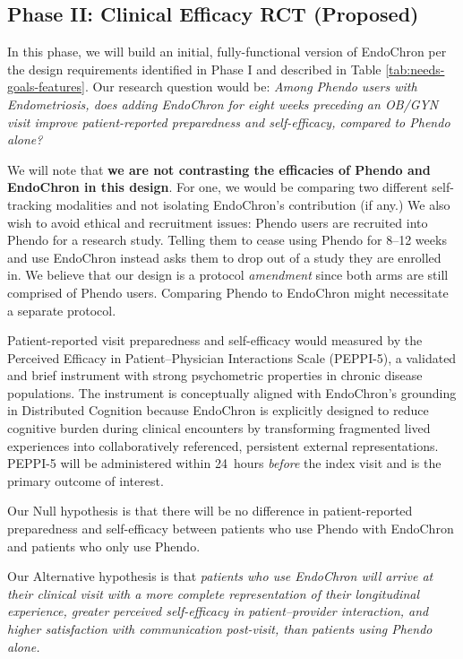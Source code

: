 \subsection{Phase II: Clinical Efficacy RCT (Proposed)}
\label{sec:efficacy-rct}

In this phase, we will build an initial, fully-functional version of EndoChron per the design requirements identified in Phase I and described in Table \ref{tab:needs-goals-features}. Our research question would be: \textit{Among Phendo users with Endometriosis, does adding EndoChron for eight weeks preceding an OB/GYN visit improve patient-reported preparedness and self-efficacy, compared to Phendo alone?}

We will note that \textbf{we are not contrasting the efficacies of Phendo and EndoChron in this design}. For one, we would be comparing two different self-tracking modalities and not isolating EndoChron's contribution (if any.) We also wish to avoid ethical and recruitment issues: Phendo users are recruited into Phendo for a research study. Telling them to cease using Phendo for 8–12 weeks and use EndoChron instead asks them to drop out of a study they are enrolled in. We believe that our design is a protocol \textit{amendment} since both arms are still comprised of Phendo users. Comparing Phendo to EndoChron might necessitate a separate protocol.

Patient-reported visit preparedness and self-efficacy would measured by the Perceived Efficacy in Patient--Physician Interactions Scale\cite{Maly1998PEPPI,tenKlooster2012PEPPI} (PEPPI-5), a validated and brief instrument with strong psychometric properties in chronic disease populations\cite{tenKlooster2012PEPPI}. The instrument is conceptually aligned with EndoChron’s grounding in Distributed Cognition because EndoChron is explicitly designed to reduce cognitive burden during clinical encounters by transforming fragmented lived experiences into collaboratively referenced, persistent external representations. PEPPI-5 will be administered within 24~hours \textit{before} the index visit and is the primary outcome of interest.

Our Null hypothesis is that there will be no difference in patient-reported preparedness and self-efficacy between patients who use Phendo with EndoChron and patients who only use Phendo.

Our Alternative hypothesis is that \textit{patients who use EndoChron will arrive at their clinical visit with  a more complete representation of their longitudinal experience,  greater perceived self-efficacy in patient--provider interaction, and  higher satisfaction with communication post-visit, than patients using Phendo alone.}

